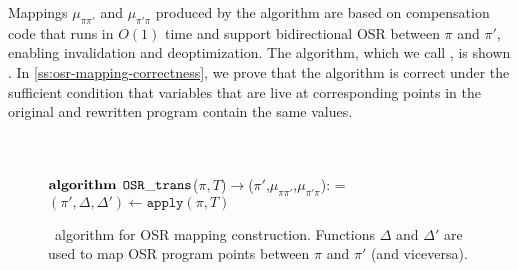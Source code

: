\noindent Mappings $\mu_{\pi\pi'}$ and $\mu_{\pi'\pi}$ produced by the algorithm are based on compensation code that runs in $O(1)$ time and support bidirectional OSR between $\pi$ and $\pi'$, enabling invalidation and deoptimization. The algorithm, which we call \osrtrans, is shown . In \mysection\ref{ss:osr-mapping-correctness}, we prove that the algorithm is correct under the sufficient condition that variables that are live at corresponding points in the original and rewritten program contain the same values.

\ifdefined\noauthorea
\begin{figure}[ht!]
\IncMargin{2em}
\begin{algorithm}[H]
\DontPrintSemicolon
\LinesNumbered
\SetAlgoNoLine
\SetNlSkip{1em} 
\Indm\Indmm
\hrulefill\\
\nonl\vspace{-2mm}\hrulefill\\
\nonl$\mathbf{algorithm} \> \> \text{${\tt OSR\_trans}$}$($\pi, T$)$\rightarrow$($\pi'$,$\mu_{\pi\pi'}$,$\mu_{\pi'\pi}$):\;
\everypar={\nl}
\Indp\Indpp
\vspace{1mm} $(\pi',\Delta,\Delta')\gets \texttt{apply}(\pi,T)$\;
\;
\vspace{-2mm}
\Indm\Indmm
\nonl\hrulefill\vspace{1mm}\\
\DecMargin{0.5em}
\caption{\label{alg:osr-trans} \osrtrans\ algorithm for OSR mapping construction. Functions $\Delta$ and $\Delta'$ are used to map OSR program points between $\pi$ and $\pi'$ (and viceversa).}
\IncMargin{0.5em}
\end{algorithm} 
\end{figure}

